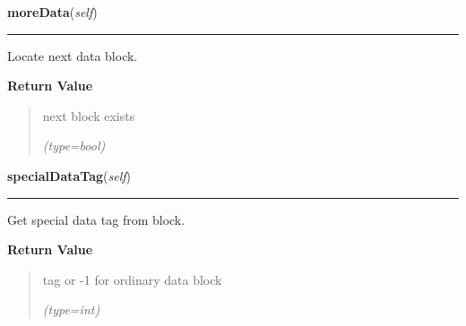     \label{mille:MilleRecord:moreData}

    \vspace{0.5ex}

\hspace{.8\funcindent}\begin{boxedminipage}{\funcwidth}

    \raggedright \textbf{moreData}(\textit{self})

    \vspace{-1.5ex}

    \rule{\textwidth}{0.5\fboxrule}
\setlength{\parskip}{2ex}
    Locate next data block.

\setlength{\parskip}{1ex}
      \textbf{Return Value}
    \vspace{-1ex}

      \begin{quote}
      next block exists

      {\it (type=bool)}

      \end{quote}

    \end{boxedminipage}

    \label{mille:MilleRecord:specialDataTag}

    \vspace{0.5ex}

\hspace{.8\funcindent}\begin{boxedminipage}{\funcwidth}

    \raggedright \textbf{specialDataTag}(\textit{self})

    \vspace{-1.5ex}

    \rule{\textwidth}{0.5\fboxrule}
\setlength{\parskip}{2ex}
    Get special data tag from block.

\setlength{\parskip}{1ex}
      \textbf{Return Value}
    \vspace{-1ex}

      \begin{quote}
      tag or -1 for ordinary data block

      {\it (type=int)}

      \end{quote}

    \end{boxedminipage}



